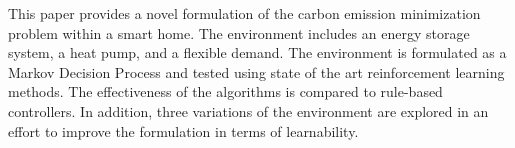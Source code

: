 This paper provides a novel formulation of the carbon emission minimization problem within a smart home. The environment includes an energy storage system, a heat pump, and a flexible demand. The environment is formulated as a Markov Decision Process and tested using state of the art reinforcement learning methods. The effectiveness of the algorithms is compared to rule-based controllers. In addition, three variations of the environment are explored in an effort to improve the formulation in terms of learnability.